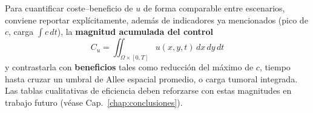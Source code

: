 Para cuantificar coste--beneficio de $u$ de forma comparable entre escenarios, conviene reportar explícitamente, además de indicadores ya mencionados (pico de $c$, carga $\int c\,dt$), la \textbf{magnitud acumulada del control}
\[
C_u=\iint_{\Omega\times[0,T]} u(x,y,t)\,dx\,dy\,dt
\]
y contrastarla con \textbf{beneficios} tales como reducción del máximo de $c$, tiempo hasta cruzar un umbral de Allee espacial promedio, o carga tumoral integrada. Las tablas cualitativas de eficiencia deben reforzarse con estas magnitudes en trabajo futuro (véase Cap.~\ref{chap:conclusiones}).







